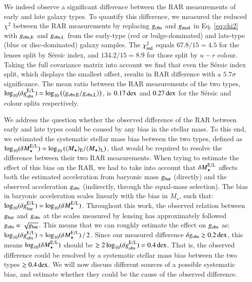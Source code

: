 \documentclass{aa}
\newcommand{\dex}{\,{\rm dex}}
\newcommand{\un}[1]{_{\rm #1}}
\begin{document}
We indeed observe a significant difference between the RAR measurements of early and late galaxy types. To quantify this difference, we measured the reduced $\chi^2$ between the RAR measurements by replacing $g\un{obs}$ and $g\un{mod}$ in Eq. \ref{eq:chi2} with $g\un{obs,E}$ and $g\un{obs,L}$ from the early-type (red or bulge-dominated) and late-type (blue or disc-dominated) galaxy samples. The $\chi\un{red}^2$ equals $67.8 / 15 = 4.5$ for the lenses split by S\'ersic index, and $134.2 / 15 = 8.9$ for those split by $u-r$ colour. Taking the full covariance matrix into account we find that even the S\'ersic index split, which displays the smallest offset, results in RAR difference with a $5.7 \sigma$ significance. The mean ratio between the RAR measurements of the two types, $\log_{10}(\delta g\un{obs}^{\rm E/L}) = \log_{10}\left( \langle g\un{obs,E} / g\un{obs,L}\rangle \right)$, is $0.17 \dex$ and $0.27 \dex$ for the S\'ersic and colour splits respectively.

We address the question whether the observed difference of the RAR between early and late types could be caused by any bias in the stellar mass. To this end, we estimated the systematic stellar mass bias between the two types, defined as $\log_{10}(\delta M_\star^{\rm E/L}) = \log_{10}\left( \langle M_\star\rangle\un{E} / \langle M_\star\rangle\un{L} \right)$, that would be required to resolve the difference between their two RAR measurements. When trying to estimate the effect of this bias on the RAR, we had to take into account that $\delta M^{\rm E/L}_\star$ affects both the estimated acceleration from baryonic mass $g\un{bar}$ (directly) and the observed acceleration $g\un{obs}$ (indirectly, through the equal-mass selection). The bias in baryonic acceleration scales linearly with the bias in $M_\star$, such that: $\log_{10}(\delta g^{\rm E/L}\un{bar}) = \log_{10}(\delta M^{\rm E/L}_\star)$. Throughout this work, the observed relation between $g\un{bar}$ and $g\un{obs}$ at the scales measured by lensing has approximately followed $g\un{obs} \propto \sqrt{g\un{bar}}$. This means that we can roughly estimate the effect on $g\un{obs}$ as: $\log_{10}(\delta g^{\rm E/L}\un{obs}) \approx {\log_{10}(\delta M^{\rm E/L}_\star)} \, / \, {2}$. Since our measured difference $\delta g\un{obs} \gtrsim 0.2 \dex$, this means ${\log_{10}(\delta M^{\rm E/L}_\star)}$ should be $\gtrsim 2 \log_{10}(\delta g^{\rm E/L}\un{obs}) = 0.4 \dex$. That is, the observed difference could be resolved by a systematic stellar mass bias between the two types $\gtrsim 0.4 \dex$. We will now discuss different sources of a possible systematic bias, and estimate whether they could be the cause of the observed difference.
\end{document}
